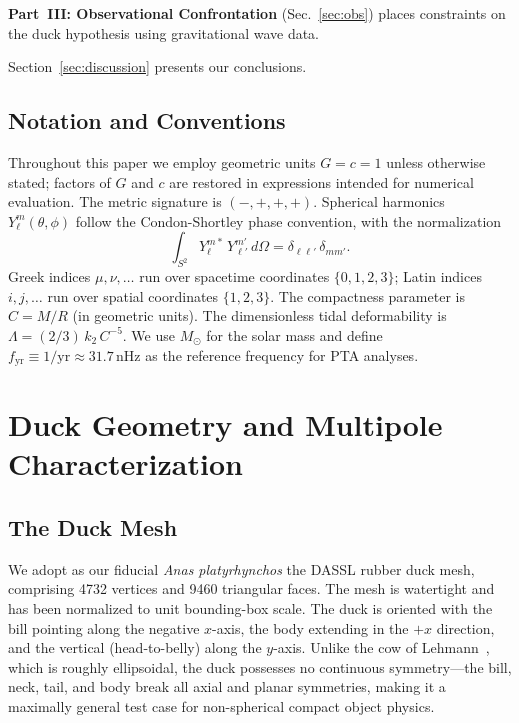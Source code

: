 \documentclass[aps,prd,twocolumn,superscriptaddress,nofootinbib]{revtex4-2}
\newcommand{\Msun}{M_\odot}
\begin{document}
\textbf{Part~III: Observational Confrontation} (Sec.~\ref{sec:obs}) places
constraints on the duck hypothesis using gravitational wave data.

Section~\ref{sec:discussion} presents our conclusions.


\subsection{Notation and Conventions}
\label{sec:notation}

Throughout this paper we employ geometric units $G = c = 1$ unless otherwise
stated; factors of $G$ and $c$ are restored in expressions intended for
numerical evaluation.
The metric signature is $(-,+,+,+)$.
Spherical harmonics $Y_\ell^m(\theta, \phi)$ follow the Condon-Shortley
phase convention, with the normalization
\begin{equation}
\int_{S^2} Y_\ell^{m*}\, Y_{\ell'}^{m'}\, d\Omega = \delta_{\ell\ell'}\,
\delta_{mm'}.
\label{eq:SH_norm}
\end{equation}
Greek indices $\mu, \nu, \ldots$ run over spacetime coordinates
$\{0, 1, 2, 3\}$; Latin indices $i, j, \ldots$ run over spatial coordinates
$\{1, 2, 3\}$.
The compactness parameter is $C = M/R$ (in geometric units).
The dimensionless tidal deformability is
$\Lambda = (2/3)\, k_2\, C^{-5}$.
We use $\Msun$ for the solar mass and define
$f_{\mathrm{yr}} \equiv 1/\mathrm{yr} \approx 31.7\,\mathrm{nHz}$ as the
reference frequency for PTA analyses.


\section{Duck Geometry and Multipole Characterization}
\label{sec:geometry}

\subsection{The Duck Mesh}
\label{sec:duck_mesh}

We adopt as our fiducial \textit{Anas platyrhynchos} the DASSL rubber duck
mesh, comprising 4732 vertices and 9460 triangular faces.
The mesh is watertight and has been normalized to unit bounding-box scale.
The duck is oriented with the bill pointing along the negative $x$-axis, the
body extending in the $+x$ direction, and the vertical (head-to-belly) along
the $y$-axis.
Unlike the cow of Lehmann~\cite{Lehmann2025}, which is roughly ellipsoidal,
the duck possesses no continuous symmetry---the bill, neck, tail, and body
break all axial and planar symmetries, making it a maximally general test
case for non-spherical compact object physics.
\end{document}
